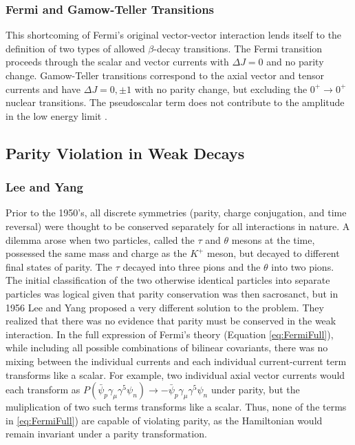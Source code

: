 \subsubsection{Fermi and Gamow-Teller Transitions}

This shortcoming of Fermi's original vector-vector interaction
lends itself to the definition of
two types of allowed $\beta$-decay transitions. The Fermi transition proceeds through the
scalar and vector currents with $\Delta J=0$ and no parity change. Gamow-Teller transitions
correspond to the axial vector and tensor currents and have $\Delta J=0,\pm1$ with no parity change,
but excluding the $0^+\rightarrow 0^+$ nuclear transitions. The pseudoscalar term does not
contribute to the amplitude in the low energy limit \cite{renton1990}.
 

\subsection{Parity Violation in Weak Decays}

\subsubsection{Lee and Yang}

Prior to the 1950's, all discrete symmetries (parity, charge conjugation, and time reversal)
were thought to be conserved separately for all interactions in nature. A dilemma arose when
two particles, called the $\tau$ and $\theta$ mesons at the time, possessed the same mass
and charge as the $K^+$ meson, but decayed to different final states of parity. The $\tau$ decayed into three pions
and the $\theta$ into two pions. The initial classification of the two otherwise identical particles into
separate particles was logical given that parity conservation was then sacrosanct,
but in 1956 Lee and Yang proposed a very different solution to the problem. They realized that
there was no evidence that parity must be conserved in the weak interaction.
In the full expression of Fermi's theory (Equation \ref{eq:FermiFull}),
while including all possible combinations of bilinear covariants, there was no mixing between the
individual currents and each individual current-current term transforms like a scalar. For example,
two individual axial vector currents would each transform as
$P(\bar{\psi}_p \gamma_\mu \gamma^5 \psi_n) \rightarrow -\bar{\psi}_p \gamma_\mu \gamma^5 \psi_n$ under parity, but the
muliplication of two such terms transforms like a scalar. Thus, none of the terms in \ref{eq:FermiFull})
are capable of violating parity, as the Hamiltonian would remain invariant under a parity transformation. 

